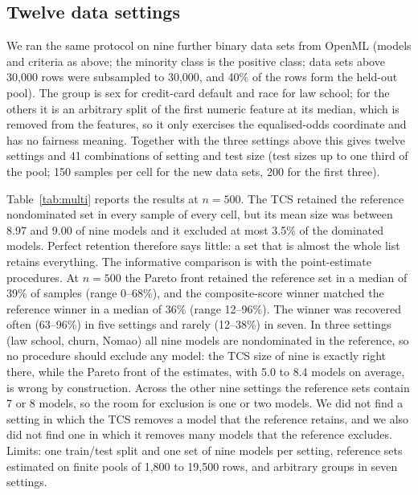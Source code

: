 \documentclass[pdflatex,sn-mathphys-num,iicol]{sn-jnl}
\theoremstyle{thmstyleone}
\theoremstyle{thmstyletwo}
\begin{document}
\subsection{Twelve data settings}\label{sec:multi}
We ran the same protocol on nine further binary data sets from OpenML (models and criteria as above; the minority class is the positive class; data sets above 30,000 rows were subsampled to 30,000, and 40\% of the rows form the held-out pool). The group is sex for credit-card default and race for law school; for the others it is an arbitrary split of the first numeric feature at its median, which is removed from the features, so it only exercises the equalised-odds coordinate and has no fairness meaning. Together with the three settings above this gives twelve settings and 41 combinations of setting and test size (test sizes up to one third of the pool; 150 samples per cell for the new data sets, 200 for the first three).

Table~\ref{tab:multi} reports the results at $n=500$. The TCS retained the reference nondominated set in every sample of every cell, but its mean size was between 8.97 and 9.00 of nine models and it excluded at most 3.5\% of the dominated models. Perfect retention therefore says little: a set that is almost the whole list retains everything. The informative comparison is with the point-estimate procedures. At $n=500$ the Pareto front retained the reference set in a median of 39\% of samples (range 0--68\%), and the composite-score winner matched the reference winner in a median of 36\% (range 12--96\%). The winner was recovered often (63--96\%) in five settings and rarely (12--38\%) in seven. In three settings (law school, churn, Nomao) all nine models are nondominated in the reference, so no procedure should exclude any model: the TCS size of nine is exactly right there, while the Pareto front of the estimates, with 5.0 to 8.4 models on average, is wrong by construction. Across the other nine settings the reference sets contain 7 or 8 models, so the room for exclusion is one or two models. We did not find a setting in which the TCS removes a model that the reference retains, and we also did not find one in which it removes many models that the reference excludes. Limits: one train/test split and one set of nine models per setting, reference sets estimated on finite pools of 1,800 to 19,500 rows, and arbitrary groups in seven settings.
\end{document}
